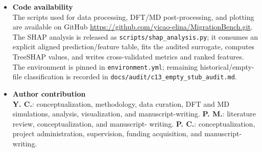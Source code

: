 \documentclass[pdflatex,sn-mathphys-num]{sn-jnl}%
\providecommand{\reviewermap}[3]{}
\theoremstyle{thmstyleone}%
\theoremstyle{thmstyletwo}%
\theoremstyle{thmstylethree}%
\begin{document}
\begin{itemize}
  \item \textbf{Code availability} \\
\reviewermap{REV-C13}{done-local}{Working SHAP pipeline, environment dependency, and empty-stub audit are released and hash-checked.}
  The scripts used for data processing, DFT/MD post-processing, and plotting are available on GitHub \url{https://github.com/yicao-elina/MigrationBench.git}. The SHAP analysis is released as \texttt{scripts/shap\_analysis.py}; it consumes an explicit aligned prediction/feature table, fits the audited surrogate, computes TreeSHAP values, and writes cross-validated metrics and ranked features. The environment is pinned in \texttt{environment.yml}; remaining historical/empty-file classification is recorded in \texttt{docs/audit/c13\_empty\_stub\_audit.md}.

  \item \textbf{Author contribution} \\
    \textbf{Y. C.}: conceptualization, methodology, data curation, DFT and MD simulations, analysis, visualization, and manuscript-writing. \textbf{P. M.}: literature review, conceptualization, and manuscript- writing. \textbf{P. C.}: conceptualization, project administration, supervision, funding acquisition, and manuscript-writing.
\end{itemize}



% 



\end{document}
